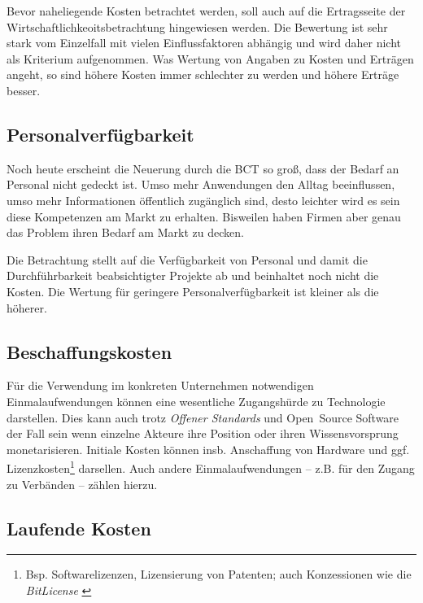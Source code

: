 Bevor naheliegende Kosten betrachtet werden, soll auch auf die Ertragsseite der Wirtschaftlichkeoitsbetrachtung hingewiesen werden.
Die Bewertung ist sehr stark vom Einzelfall mit vielen Einflussfaktoren 
abhängig und wird daher nicht als Kriterium aufgenommen.
Was Wertung von Angaben zu Kosten und Erträgen angeht, so sind höhere Kosten immer schlechter zu werden und höhere Erträge besser.

\subsection{Personalverfügbarkeit}\label{krit:personal}

Noch heute erscheint die Neuerung durch die \gls{BCT} so groß, dass der Bedarf an Personal nicht gedeckt ist.
Umso mehr Anwendungen den Alltag beeinflussen, umso mehr Informationen öffentlich zugänglich sind, desto leichter wird es sein diese Kompetenzen am Markt zu erhalten.
Bisweilen haben Firmen aber genau das Problem ihren Bedarf am Markt zu decken.

Die Betrachtung stellt auf die Verfügbarkeit von Personal und damit die Durchführbarkeit beabsichtigter Projekte ab und beinhaltet noch nicht die Kosten. 
Die Wertung für geringere Personalverfügbarkeit ist kleiner als die höherer.

\subsection{Beschaffungskosten}\label{kosten}

Für die Verwendung im konkreten Unternehmen notwendigen Einmalaufwendungen können eine wesentliche Zugangshürde zu Technologie darstellen.
Dies kann auch trotz \emph{Offener Standards} und Open~Source Software der Fall sein wenn einzelne Akteure ihre Position oder ihren Wissensvorsprung monetarisieren.
Initiale Kosten können insb. Anschaffung von Hardware und ggf. Lizenzkosten\footnote{Bsp. Softwarelizenzen, Lizensierung von Patenten; auch Konzessionen wie die \emph{BitLicense} \autocite{w:bitlicense}} darsellen.
Auch andere Einmalaufwendungen -- z.B. für den Zugang zu Verbänden -- zählen hierzu.

\subsection{Laufende Kosten}

